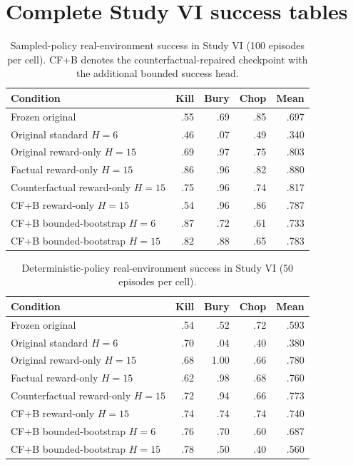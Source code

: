 \documentclass[10pt]{article}
\begin{document}
\section{Complete Study VI success tables}

\begin{table}[H]
\centering
\small
\caption{Sampled-policy real-environment success in Study VI (100 episodes per cell). CF+B denotes the counterfactual-repaired checkpoint with the additional bounded success head.}
\begin{tabular}{lrrrr}
\toprule
Condition & Kill & Bury & Chop & Mean \\
\midrule
Frozen original & .55 & .69 & .85 & .697 \\
Original standard $H=6$ & .46 & .07 & .49 & .340 \\
Original reward-only $H=15$ & .69 & .97 & .75 & .803 \\
Factual reward-only $H=15$ & .86 & .96 & .82 & .880 \\
Counterfactual reward-only $H=15$ & .75 & .96 & .74 & .817 \\
CF+B reward-only $H=15$ & .54 & .96 & .86 & .787 \\
CF+B bounded-bootstrap $H=6$ & .87 & .72 & .61 & .733 \\
CF+B bounded-bootstrap $H=15$ & .82 & .88 & .65 & .783 \\
\bottomrule
\end{tabular}
\end{table}

\begin{table}[H]
\centering
\small
\caption{Deterministic-policy real-environment success in Study VI (50 episodes per cell).}
\begin{tabular}{lrrrr}
\toprule
Condition & Kill & Bury & Chop & Mean \\
\midrule
Frozen original & .54 & .52 & .72 & .593 \\
Original standard $H=6$ & .70 & .04 & .40 & .380 \\
Original reward-only $H=15$ & .68 & 1.00 & .66 & .780 \\
Factual reward-only $H=15$ & .62 & .98 & .68 & .760 \\
Counterfactual reward-only $H=15$ & .72 & .94 & .66 & .773 \\
CF+B reward-only $H=15$ & .74 & .74 & .74 & .740 \\
CF+B bounded-bootstrap $H=6$ & .76 & .70 & .60 & .687 \\
CF+B bounded-bootstrap $H=15$ & .78 & .50 & .40 & .560 \\
\bottomrule
\end{tabular}
\end{table}
\end{document}

